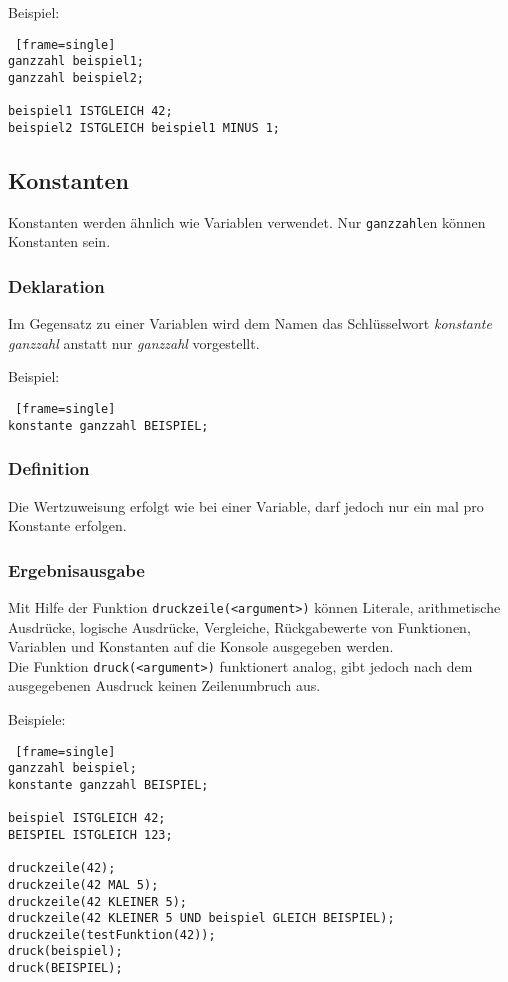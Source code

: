 \documentclass[12pt, a4paper, oneside, ngerman]{article}
\begin{document}
\medskip
\noindent
Beispiel:
\begin{lstlisting} [frame=single] 
ganzzahl beispiel1;
ganzzahl beispiel2;

beispiel1 ISTGLEICH 42;
beispiel2 ISTGLEICH beispiel1 MINUS 1;
\end{lstlisting}

\pagebreak
\subsection{Konstanten}
Konstanten werden ähnlich wie Variablen verwendet. Nur \texttt{ganzzahl}en können Konstanten sein.

\subsubsection{Deklaration}
Im Gegensatz zu einer Variablen wird dem Namen das Schlüsselwort \textit{konstante ganzzahl} anstatt nur \textit{ganzzahl} vorgestellt.

\medskip
\noindent
Beispiel:
\begin{lstlisting} [frame=single] 
konstante ganzzahl BEISPIEL;
\end{lstlisting}

\subsubsection{Definition}
Die Wertzuweisung erfolgt wie bei einer Variable, darf jedoch nur ein mal pro Konstante erfolgen.
 

\subsubsection{Ergebnisausgabe}
Mit Hilfe der Funktion \texttt{druckzeile(<argument>)} können Literale, arithmetische Ausdrücke, logische Ausdrücke, Vergleiche, Rückgabewerte von Funktionen, Variablen und Konstanten auf die Konsole ausgegeben werden. \\
Die Funktion \texttt{druck(<argument>)} funktionert analog, gibt jedoch nach dem ausgegebenen Ausdruck keinen Zeilenumbruch aus.

\medskip
\noindent
Beispiele:
\begin{lstlisting} [frame=single] 
ganzzahl beispiel;
konstante ganzzahl BEISPIEL;

beispiel ISTGLEICH 42;
BEISPIEL ISTGLEICH 123;

druckzeile(42);
druckzeile(42 MAL 5);
druckzeile(42 KLEINER 5);
druckzeile(42 KLEINER 5 UND beispiel GLEICH BEISPIEL);
druckzeile(testFunktion(42));
druck(beispiel);
druck(BEISPIEL);
\end{lstlisting}
\end{document}
